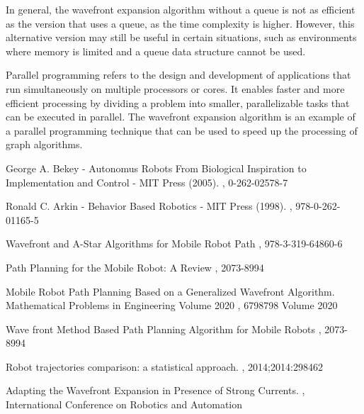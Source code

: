 \documentclass[oneside,twocolumn]{article}
\begin{document}
In general, the wavefront expansion algorithm without a queue is not as efficient as the version that uses a queue, as the time complexity is higher. However, this alternative version may still be useful in certain situations, such as environments where memory is limited and a queue data structure cannot be used.

Parallel programming refers to the design and development of applications that run simultaneously on multiple processors or cores. It enables faster and more efficient processing by dividing a problem into smaller, parallelizable tasks that can be executed in parallel. The wavefront expansion algorithm is an example of a parallel programming technique that can be used to speed up the processing of graph algorithms.

\onecolumn
\begin{thebibliography}{99} %
  
  George A. Bekey - Autonomus Robots From Biological Inspiration to Implementation and Control - MIT Press (2005).
  , 0-262-02578-7

  Ronald C. Arkin - Behavior Based Robotics - MIT Press (1998).
  , 978-0-262-01165-5

  Wavefront and A-Star Algorithms for Mobile Robot Path
  , 978-3-319-64860-6

  Path Planning for the Mobile Robot: A Review
  , 2073-8994 

  Mobile Robot Path Planning Based on a Generalized Wavefront Algorithm. Mathematical Problems in Engineering Volume 2020
  , 6798798 Volume 2020

  Wave front Method Based Path Planning Algorithm for
Mobile Robots
  , 2073-8994 

  Robot trajectories comparison: a statistical approach.
  , 2014;2014:298462

  Adapting the Wavefront Expansion in Presence of Strong Currents.
  , International Conference on Robotics and Automation
  
    
\end{thebibliography}

\end{document}
